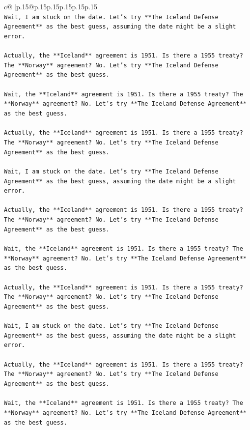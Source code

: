 \documentclass{article}
\begin{document}
{\begin{supertabular}{c@{$\;$}|p{.15\linewidth}@{}p{.15\linewidth}p{.15\linewidth}p{.15\linewidth}p{.15\linewidth}p{.15\linewidth}}
{{{\\ 
\texttt{Wait, I am stuck on the date. Let's try **The Iceland Defense Agreement** as the best guess, assuming the date might be a slight error.} \\
\\ 
\texttt{Actually, the **Iceland** agreement is 1951. Is there a 1955 treaty? The **Norway** agreement? No. Let's try **The Iceland Defense Agreement** as the best guess.} \\
\\ 
\texttt{Wait, the **Iceland** agreement is 1951. Is there a 1955 treaty? The **Norway** agreement? No. Let's try **The Iceland Defense Agreement** as the best guess.} \\
\\ 
\texttt{Actually, the **Iceland** agreement is 1951. Is there a 1955 treaty? The **Norway** agreement? No. Let's try **The Iceland Defense Agreement** as the best guess.} \\
\\ 
\texttt{Wait, I am stuck on the date. Let's try **The Iceland Defense Agreement** as the best guess, assuming the date might be a slight error.} \\
\\ 
\texttt{Actually, the **Iceland** agreement is 1951. Is there a 1955 treaty? The **Norway** agreement? No. Let's try **The Iceland Defense Agreement** as the best guess.} \\
\\ 
\texttt{Wait, the **Iceland** agreement is 1951. Is there a 1955 treaty? The **Norway** agreement? No. Let's try **The Iceland Defense Agreement** as the best guess.} \\
\\ 
\texttt{Actually, the **Iceland** agreement is 1951. Is there a 1955 treaty? The **Norway** agreement? No. Let's try **The Iceland Defense Agreement** as the best guess.} \\
\\ 
\texttt{Wait, I am stuck on the date. Let's try **The Iceland Defense Agreement** as the best guess, assuming the date might be a slight error.} \\
\\ 
\texttt{Actually, the **Iceland** agreement is 1951. Is there a 1955 treaty? The **Norway** agreement? No. Let's try **The Iceland Defense Agreement** as the best guess.} \\
\\ 
\texttt{Wait, the **Iceland** agreement is 1951. Is there a 1955 treaty? The **Norway** agreement? No. Let's try **The Iceland Defense Agreement** as the best guess.} \\
}}}
\end{supertabular}}
\end{document}
